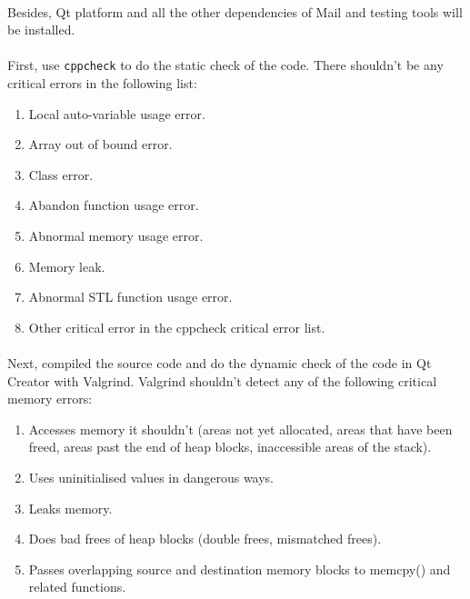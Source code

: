 \documentclass[11pt,a4paper]{article}
\begin{document}
            \paragraph{} Besides, Qt platform and all the other dependencies of Mail and testing tools will be installed.
            \paragraph{} First, use \texttt{cppcheck} to do the static check of the code. There shouldn't be any critical errors in the following list:
            \begin{enumerate}
                \item Local auto-variable usage error.
                \item Array out of bound error.
                \item Class error.
                \item Abandon function usage error.
                \item Abnormal memory usage error.
                \item Memory leak.
                \item Abnormal STL function usage error.
                \item Other critical error in the cppcheck critical error list.
            \end{enumerate}
            \paragraph{} Next, compiled the source code and do the dynamic check of the code in Qt Creator with Valgrind. Valgrind shouldn't detect any of the following critical memory errors:
            \begin{enumerate}
                \item Accesses memory it shouldn't (areas not yet allocated, areas that have been freed, areas past the end of heap blocks, inaccessible areas of the stack).
                \item Uses uninitialised values in dangerous ways.
                \item Leaks memory.
                \item Does bad frees of heap blocks (double frees, mismatched frees).
                \item Passes overlapping source and destination memory blocks to memcpy() and related functions.
            \end{enumerate}
\end{document}
